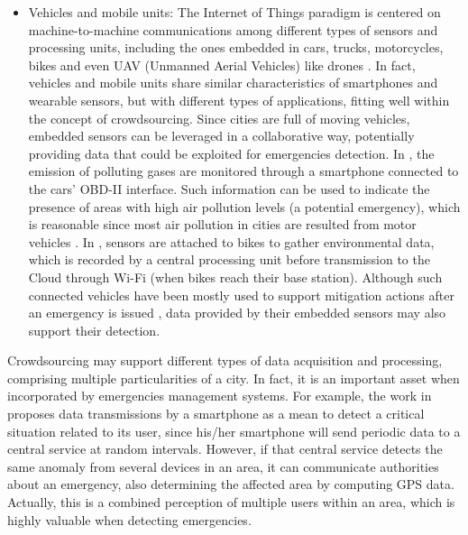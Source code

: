 \begin{refsection}
\begin{itemize}
  \item Vehicles and mobile units: The Internet of Things paradigm is centered on machine-to-machine communications among different types of sensors and processing units, including the ones embedded in cars, trucks, motorcycles, bikes and even UAV (Unmanned Aerial Vehicles) like drones \cite{iotsurvey,SurveyIoT}. In fact, vehicles and mobile units share similar characteristics of smartphones and wearable sensors, but with different types of applications, fitting well within the concept of crowdsourcing. Since cities are full of moving vehicles, embedded sensors can be leveraged in a collaborative way, potentially providing data that could be exploited for emergencies detection. In \cite{carpollution}, the emission of polluting gases are monitored through a smartphone connected to the cars' OBD-II interface. Such information can be used to indicate the presence of areas with high air pollution levels (a potential emergency), which is reasonable since most air pollution in cities are resulted from motor vehicles \cite{pollutioncities1}. In \cite{iotBike1}, sensors are attached to bikes to gather environmental data, which is recorded by a central processing unit before transmission to the Cloud through Wi-Fi (when bikes reach their base station). Although such connected vehicles have been mostly used to support mitigation actions after an emergency is issued \cite{mitigationDrone1,mitigationDrone2,mitigationITS1}, data provided by their embedded sensors may also support their detection.
\end{itemize}

Crowdsourcing may support different types of data acquisition and processing, comprising multiple particularities of a city. In fact, it is an important asset when incorporated by emergencies management systems. For example, the work in \cite{crowdsourcing4} proposes data transmissions by a smartphone as a mean to detect a critical situation related to its user, since his/her smartphone will send periodic data to a central service at random intervals. However, if that central service detects the same anomaly from several devices in an area, it can communicate authorities about an emergency, also determining the affected area by computing GPS data. Actually, this is a combined perception of multiple users within an area, which is highly valuable when detecting emergencies.


\end{refsection}
